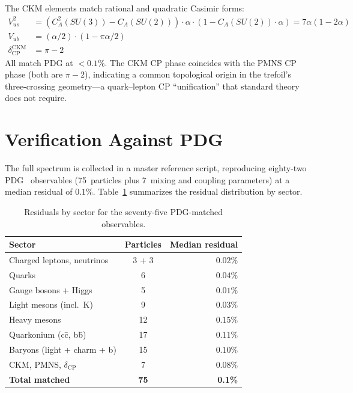 \documentclass[11pt]{article}
\newcommand{\CA}{C_A}
\begin{document}
The CKM elements match rational and quadratic Casimir forms:
\begin{align}
  V_{us}^2 &= (\CA^2(SU(3)) - \CA(SU(2)))\cdot\alpha \cdot
              (1 - \CA(SU(2))\cdot\alpha) = 7\alpha(1-2\alpha) \\
  V_{ub}   &= (\alpha/2)\cdot(1 - \pi\alpha/2) \\
  \delta_\text{CP}^\text{CKM} &= \pi - 2
\end{align}
All match PDG at $<0.1\%$.  The CKM CP phase coincides with the
PMNS CP phase (both are $\pi-2$), indicating a common topological
origin in the trefoil's three-crossing geometry---a quark--lepton
CP ``unification'' that standard theory does not require.

\section{Verification Against PDG}
\label{sec:verification}

The full spectrum is collected in a master reference script,
reproducing eighty-two PDG~\cite{PDG2024} observables
(75~particles plus 7~mixing and coupling parameters) at a median
residual of $0.1\%$.  Table~\ref{tab:summary} summarizes the
residual distribution by sector.

\begin{table}[h]
\centering
\begin{tabular}{lcr}
\toprule
Sector & Particles & Median residual \\
\midrule
Charged leptons, neutrinos  & 3 + 3 &  $0.02\%$ \\
Quarks                       & 6     &  $0.04\%$ \\
Gauge bosons + Higgs         & 5     &  $0.01\%$ \\
Light mesons (incl.\ K)      & 9     &  $0.03\%$ \\
Heavy mesons                 & 12    &  $0.15\%$ \\
Quarkonium (c\=c, b\=b)      & 17    &  $0.11\%$ \\
Baryons (light + charm + b)  & 15    &  $0.10\%$ \\
\midrule
CKM, PMNS, $\delta_\text{CP}$ & 7 & $0.08\%$ \\
\midrule
\textbf{Total matched}           & \textbf{75} & \textbf{0.1\%} \\
\bottomrule
\end{tabular}
\caption{Residuals by sector for the seventy-five PDG-matched
observables.}
\label{tab:summary}
\end{table}
\end{document}
